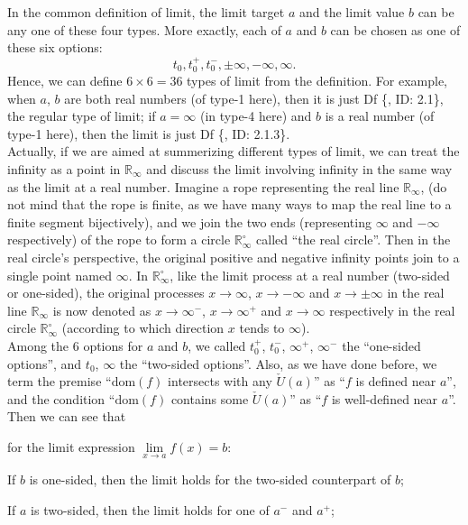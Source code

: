 \documentclass{article}
\begin{document}
\begin{Rmk}{}
    In the common definition of limit, the limit target $a$ and the limit value $b$ can be any one of these four types. More exactly, each of $a$ and $b$ can be chosen as one of these six options:
    $$ t_0, t_0^+, t_0^-, \pm\infty, -\infty, \infty. $$
    Hence, we can define $6\times 6 = 36$ types of limit from the definition. For example, when $a$, $b$ are both real numbers (of type-1 here), then it is just Df \{, ID: 2.1\}, the regular type of limit; if $a = \infty$ (in type-4 here) and $b$ is a real number (of type-1 here), then the limit is just Df \{, ID: 2.1.3\}.\\
    Actually, if we are aimed at summerizing different types of limit, we can treat the infinity as a point in $\mathbb{R}_\infty$ and discuss the limit involving infinity in the same way as the limit at a real number. \textcolor{Df}{Imagine a rope representing the real line $\mathbb{R}_\infty$, (do not mind that the rope is finite, as we have many ways to map the real line to a finite segment bijectively), and we join the two ends (representing $\infty$ and $-\infty$ respectively) of the rope to form a circle $\mathbb{R}_\infty^\circ$ called ``the real circle''. Then in the real circle's perspective, the original positive and negative infinity points join to a single point named $\infty$. In $\mathbb{R}_\infty^\circ$, like the limit process at a real number (two-sided or one-sided), the original processes $x\rightarrow\infty$, $x\rightarrow -\infty$ and $x\rightarrow\pm\infty$ in the real line $\mathbb{R}_\infty$ is now denoted as $x\rightarrow \infty^-$, $x\rightarrow \infty^+$ and $x\rightarrow \infty$ respectively in the real circle $\mathbb{R}_\infty^\circ$ (according to which direction $x$ tends to $\infty$).}\\
    \textcolor{Df}{Among the 6 options for $a$ and $b$, we called $t_0^+$, $t_0^-$, $\infty^+$, $\infty^-$ the ``one-sided options'', and $t_0$, $\infty$ the ``two-sided options''.} Also, as we have done before, \textcolor{Df}{we term the premise ``$\text{dom}(f)$ intersects with any $\check{U}(a)$'' as ``$f$ is defined near $a$''}, and \textcolor{Df}{the condition ``$\text{dom}(f)$ contains some $\check{U}(a)$'' as ``$f$ is well-defined near $a$''.} Then we can see that \textcolor{Th}{ for the limit expression $\lim\limits_{x\to a} f(x) = b$:
    \begin{compactenum}
        \item If $b$ is one-sided, then the limit holds for the two-sided counterpart of $b$;
        \item If $a$ is two-sided, then the limit holds for one of $a^-$ and $a^+$;

\end{compactenum}}
\end{Rmk}
\end{document}
